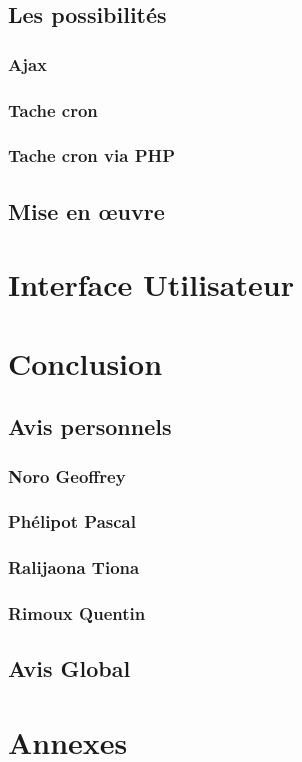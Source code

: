 \documentclass[11pt,a4paper]{article}
\begin{document}
\subsection{Les possibilités}
\subsubsection{Ajax}
\subsubsection{Tache cron}
\subsubsection{Tache cron via PHP}
\subsection{Mise en œuvre}

\newpage\section{Interface Utilisateur}

\newpage\section{Conclusion}
\subsection{Avis personnels}
\subsubsection{Noro Geoffrey}
\subsubsection{Phélipot Pascal}
\subsubsection{Ralijaona Tiona}
\subsubsection{Rimoux Quentin}
\subsection{Avis Global}

\newpage{}
\section{Annexes}
\end{document}

